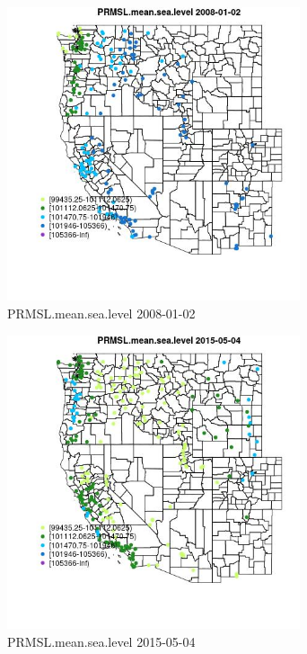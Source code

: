 \begin{figure} 
\centering  
\includegraphics[width=0.77\textwidth]{Code_Outputs/Report_ML_input_PM25_Step4_part_e_de_duplicated_aves_compiled_2019-05-18wNAs_MapObsPRMSLmeansealevel2008-01-02.jpg} 
\caption{\label{fig:Report_ML_input_PM25_Step4_part_e_de_duplicated_aves_compiled_2019-05-18wNAsMapObsPRMSLmeansealevel2008-01-02}PRMSL.mean.sea.level 2008-01-02} 
\end{figure} 
 

\begin{figure} 
\centering  
\includegraphics[width=0.77\textwidth]{Code_Outputs/Report_ML_input_PM25_Step4_part_e_de_duplicated_aves_compiled_2019-05-18wNAs_MapObsPRMSLmeansealevel2015-05-04.jpg} 
\caption{\label{fig:Report_ML_input_PM25_Step4_part_e_de_duplicated_aves_compiled_2019-05-18wNAsMapObsPRMSLmeansealevel2015-05-04}PRMSL.mean.sea.level 2015-05-04} 
\end{figure} 
 

